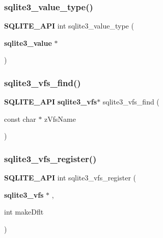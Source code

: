 \mbox{\label{sqlite3_8h_ac5e91a982065a1ab220a43bbd18cfa60}} 
\subsubsection{sqlite3\_value\_type()}
{\footnotesize\ttfamily \textbf{ S\+Q\+L\+I\+T\+E\+\_\+\+A\+PI} int sqlite3\+\_\+value\+\_\+type (\begin{DoxyParamCaption}\item[{\textbf{ sqlite3\+\_\+value} $\ast$}]{ }\end{DoxyParamCaption})}

\mbox{\label{sqlite3_8h_ac201a26de3dfa1d6deb8069eb8d95627}} 
\subsubsection{sqlite3\_vfs\_find()}
{\footnotesize\ttfamily \textbf{ S\+Q\+L\+I\+T\+E\+\_\+\+A\+PI} \textbf{ sqlite3\+\_\+vfs}$\ast$ sqlite3\+\_\+vfs\+\_\+find (\begin{DoxyParamCaption}\item[{const char $\ast$}]{z\+Vfs\+Name }\end{DoxyParamCaption})}

\mbox{\label{sqlite3_8h_a7184b289ccd4c4c7200589137d88c4ae}} 
\subsubsection{sqlite3\_vfs\_register()}
{\footnotesize\ttfamily \textbf{ S\+Q\+L\+I\+T\+E\+\_\+\+A\+PI} int sqlite3\+\_\+vfs\+\_\+register (\begin{DoxyParamCaption}\item[{\textbf{ sqlite3\+\_\+vfs} $\ast$}]{,  }\item[{int}]{make\+Dflt }\end{DoxyParamCaption})}

\mbox{\label{sqlite3_8h_a1bd343f84cfe74c81c8080905814abd9}} 
